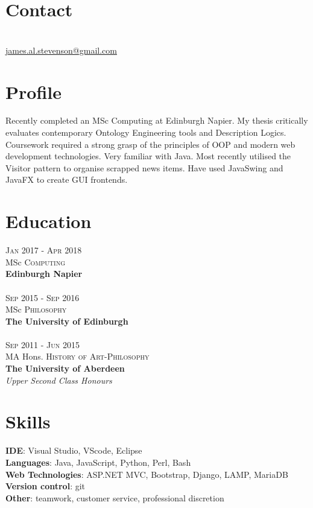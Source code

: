 \documentclass[12pt, a4paper]{article}
\begin{document}
\par{\bigskip\par}
\section{Contact}
\large{}\\
\href{mailto:james.al.stevenson@gmail.com}{james.al.stevenson@gmail.com}\\

\begin{multicols}{2}

\section{Profile}
Recently completed an MSc Computing at Edinburgh Napier.
My thesis critically evaluates contemporary Ontology Engineering tools and Description Logics.
Coursework required a strong grasp of the principles of OOP and modern web development technologies.
Very familiar with Java.
Most recently utilised the Visitor pattern to organise scrapped news items.
Have used JavaSwing and JavaFX to create GUI frontends.

\section{Education}
\textsc{Jan} 2017 - \textsc{Apr} 2018\\
MSc \textsc{Computing} \\
\textbf{Edinburgh Napier}\\~\\
\textsc{Sep} 2015 - \textsc{Sep} 2016\\
MSc \textsc{Philosophy} \\ 
\textbf{The University of Edinburgh}\\~\\
\textsc{Sep} 2011 - \textsc{Jun} 2015\\
MA Hons. \textsc{History of Art}-\textsc{Philosophy}\\ 
\textbf{The University of Aberdeen}\\ 
\small\emph{Upper Second Class Honours}\\

\section{Skills}
\large{\textbf{IDE}: Visual Studio, VScode, Eclipse\\
\textbf{Languages}: Java, JavaScript, Python, Perl, Bash\\
\textbf{Web Technologies}: ASP.NET MVC, Bootstrap, Django, LAMP, MariaDB\\
\textbf{Version control}: git\\
\textbf{Other}: teamwork, customer service, professional discretion\\}



\end{multicols}
\end{document}
